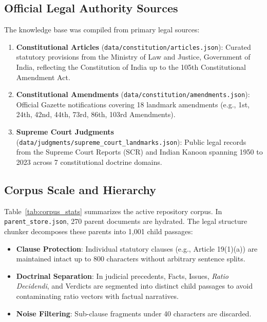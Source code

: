 \documentclass[10pt,twocolumn]{article}
\begin{document}
\subsection{Official Legal Authority Sources}
The knowledge base was compiled from primary legal sources:
\begin{enumerate}[leftmargin=*]
    \item \textbf{Constitutional Articles} (\texttt{data/constitution/articles.json}): Curated statutory provisions from the Ministry of Law and Justice, Government of India, reflecting the Constitution of India up to the 105th Constitutional Amendment Act.
    \item \textbf{Constitutional Amendments} (\texttt{data/constitution/amendments.json}): Official Gazette notifications covering 18 landmark amendments (e.g., 1st, 24th, 42nd, 44th, 73rd, 86th, 103rd Amendments).
    \item \textbf{Supreme Court Judgments} (\texttt{data/judgments/supreme\_court\_landmarks.json}): Public legal records from the Supreme Court Reports (SCR) and Indian Kanoon spanning 1950 to 2023 across 7 constitutional doctrine domains.
\end{enumerate}

\subsection{Corpus Scale and Hierarchy}
Table~\ref{tab:corpus_stats} summarizes the active repository corpus. In \texttt{parent\_store.json}, 270 parent documents are hydrated. The legal structure chunker decomposes these parents into 1,001 child passages:
\begin{itemize}[leftmargin=*]
    \item \textbf{Clause Protection}: Individual statutory clauses (e.g., Article 19(1)(a)) are maintained intact up to 800 characters without arbitrary sentence splits.
    \item \textbf{Doctrinal Separation}: In judicial precedents, Facts, Issues, \textit{Ratio Decidendi}, and Verdicts are segmented into distinct child passages to avoid contaminating ratio vectors with factual narratives.
    \item \textbf{Noise Filtering}: Sub-clause fragments under 40 characters are discarded.
\end{itemize}
\end{document}
